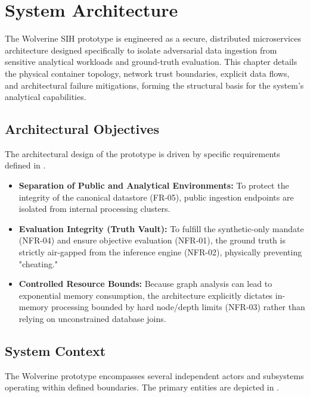 \chapter{System Architecture}
\label{ch:system-architecture}

The Wolverine SIH prototype is engineered as a secure, distributed microservices architecture designed specifically to isolate adversarial data ingestion from sensitive analytical workloads and ground-truth evaluation. This chapter details the physical container topology, network trust boundaries, explicit data flows, and architectural failure mitigations, forming the structural basis for the system's analytical capabilities.

\section{Architectural Objectives}
\label{sec:arch-objectives}
The architectural design of the prototype is driven by specific requirements defined in .

\begin{itemize}
    \item \textbf{Separation of Public and Analytical Environments:} To protect the integrity of the canonical datastore (FR-05), public ingestion endpoints are isolated from internal processing clusters.
    \item \textbf{Evaluation Integrity (Truth Vault):} To fulfill the synthetic-only mandate (NFR-04) and ensure objective evaluation (NFR-01), the ground truth is strictly air-gapped from the inference engine (NFR-02), physically preventing "cheating."
    \item \textbf{Controlled Resource Bounds:} Because graph analysis can lead to exponential memory consumption, the architecture explicitly dictates in-memory processing bounded by hard node/depth limits (NFR-03) rather than relying on unconstrained database joins.
\end{itemize}

\section{System Context}
\label{sec:arch-context}
The Wolverine prototype encompasses several independent actors and subsystems operating within defined boundaries. The primary entities are depicted in .

